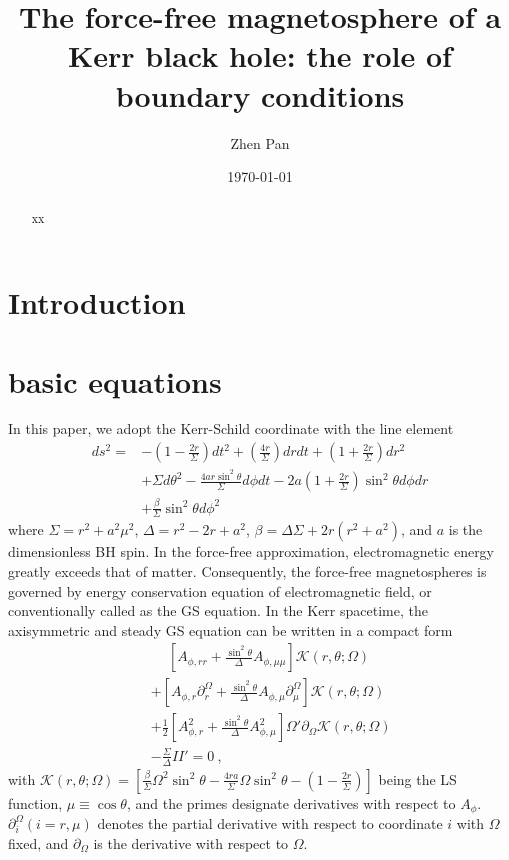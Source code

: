 \documentclass[aps,prd,reprint,nofootinbib, superscriptaddress]{revtex4-1}
\def\nn{\nonumber}
\def\ct{\cos\theta}
\def\sst{\sin^2\theta}
\def\Ar{A_{\phi,r}}
\def\Arr{A_{\phi,rr}}
\def\Am{A_{\phi,\mu}}
\def\Amm{A_{\phi,\mu\mu}}
\def\ben{\begin{eqnarray}}
\def\een{\end{eqnarray}}
\begin{document}
\title{The force-free magnetosphere of a Kerr black hole: the role of boundary conditions}
\author{Zhen Pan}

\date{\today}

\begin{abstract}
    xx
\end{abstract}


\maketitle

\section{Introduction}

\section{basic equations}
\label{sec:basic}
In this paper, we adopt the Kerr-Schild
coordinate with the line element
\[
\begin{aligned}
ds^2 =
&-\left( 1-\frac{2r}{\Sigma} \right)dt^2 + \left( \frac{4
r}{\Sigma} \right) dr dt + \left(1+\frac{2r}{\Sigma} \right) dr^2 \\
&+ \Sigma d\theta^2 - \frac{4 a r \sin^2\theta}{\Sigma} d\phi dt
- 2 a \left(1+\frac{2r}{\Sigma}\right) \sin^2\theta d\phi dr     \\
& + \frac{\beta}{\Sigma} \sst d\phi^2
\end{aligned}
\]
where $\Sigma = r^2 + a^2 \mu^2$, $\Delta = r^2 -2r + a^2$,
$\beta = \Delta\Sigma + 2r(r^2 + a^2)$, and $a$ is the dimensionless BH spin.
In the force-free approximation, electromagnetic energy greatly exceeds that of matter.
Consequently, the force-free magnetospheres is governed by energy
conservation equation of electromagnetic field, or
conventionally called as the GS equation.
In the Kerr spacetime,
the axisymmetric and steady GS equation can be written in a compact form \cite{Pan2017}
\ben
\label{eq:GSg}
&&\phantom{+}
 \left[\Arr + \frac{\sst}{\Delta}\Amm \right]  \mathcal K(r,\theta; \Omega )\nn \\
&&
+\left[\Ar \partial_r^\Omega  +  \frac{\sst}{\Delta}\Am \partial_\mu^\Omega\right] \mathcal K(r,\theta; \Omega ) \nn \\
&&
+ \frac{1}{2}\left[\Ar^2 + \frac{\sst}{\Delta}\Am^2\right]  \Omega' \partial_\Omega \mathcal K(r,\theta; \Omega )\nn \\
&&
- \frac{\Sigma}{\Delta}II' = 0 \ ,
\een
with $\mathcal K(r,\theta; \Omega )= \left[\frac{\beta}{\Sigma}\Omega^2 \sst
-\frac{4ra}{\Sigma}\Omega \sst
-\left(1-\frac{2r}{\Sigma}\right)\right]$ being the LS function,
$\mu\equiv\ct$,  and  the primes designate  derivatives with respect to $A_\phi$.
$\partial_i^\Omega (i=r, \mu)$  denotes the partial derivative
with respect to coordinate $i$ with $\Omega$ fixed, and $\partial_\Omega$ is the derivative with
respect to $\Omega$.
\end{document}
